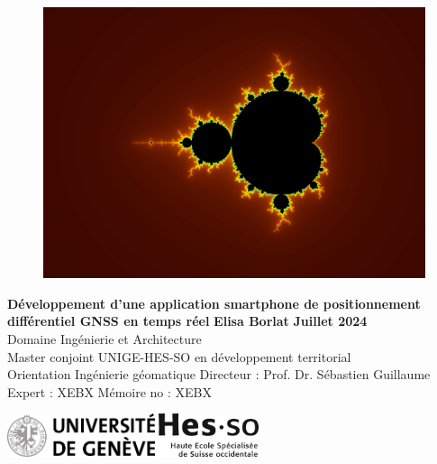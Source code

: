 \documentclass[twoside]{report}
\begin{document}
\begin{titlepage}
 	\begin{flushleft}
        \begin{figure}[ht]
            \centering
            \begin{minipage}[b]{0.98\textwidth}
                \includegraphics[width=\linewidth]{cover-fractal.png}
            \end{minipage}%
            \begin{minipage}[b]{0.02\textwidth}
                \hfill %
                \vspace*{\fill}
            \end{minipage}
        \end{figure}
                    \vspace{0.5cm}
    			{\huge \bfseries Développement d'une application smartphone de positionnement différentiel GNSS en temps réel} \vfill
            	{\huge \textbf {Elisa Borlat}} \vfill
            	{\Large \textbf {Juillet 2024}\\
            	{\Large Domaine Ingénierie et Architecture}\\
            	{\large Master conjoint UNIGE-HES-SO en développement territorial}\\
            	{\large Orientation Ingénierie géomatique}\vfill
            	{\small Directeur : Prof. Dr. Sébastien Guillaume\\
                Expert : XEBX}\vfill
                {\small Mémoire no : XEBX }}
          \end{flushleft}
          \vfill
		\includegraphics[height=1.25cm]{uni_GE.png}
		\hspace{1.5cm}
		\includegraphics[height=1.25cm]{hesso.jpg}
		\vfill
\end{titlepage}
\end{document}
